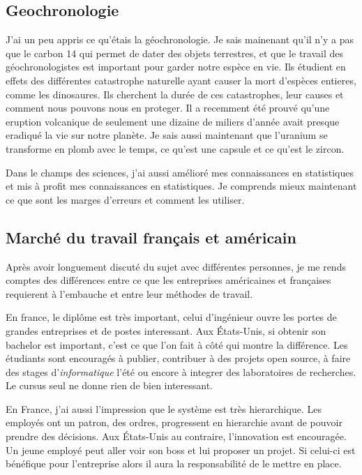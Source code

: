 \subsection{Geochronologie}
J'ai un peu appris ce qu'étais la géochronologie. Je sais mainenant qu'il n'y a pas que le carbon 14 qui permet de dater des objets terrestres, et que le travail des géochronologistes est important pour garder notre espèce en vie. Ils étudient en effets des différentes catastrophe naturelle ayant causer la mort d'espèces entieres, comme les dinosaures. Ils cherchent la durée de ces catastrophes, leur causes et comment nous pouvons nous en proteger. Il a recemment été prouvé qu'une eruption volcanique de seulement une dizaine de miliers d'année avait presque eradiqué la vie sur notre planète.
Je sais aussi maintenant que l'uranium se transforme en plomb avec le temps, ce qu'est une capsule et ce qu'est le zircon.

Dans le champs des sciences, j'ai aussi amélioré mes connaissances en statistiques et mis à profit mes connaissances en statistiques. Je comprends mieux maintenant ce que sont les marges d'erreurs et comment les utiliser.

\subsection{Marché du travail français et américain}
Après avoir longuement discuté du sujet avec différentes personnes, je me rends comptes des différences entre ce que les entreprises américaines et françaises requierent à l'embauche et entre leur méthodes de travail. 

En france, le diplôme est très important, celui d'ingénieur ouvre les portes de grandes entreprises et de postes interessant. Aux États-Unis, si obtenir son bachelor est important, c'est ce que l'on fait à côté qui montre la différence. Les étudiants sont encouragés à publier, contribuer à des projets open source, à faire des stages d'\emph{informatique} l'été ou encore à integrer des laboratoires de recherches. Le cursus seul ne donne rien de bien interessant.

En France, j'ai aussi l'impression que le système est très hierarchique. Les employés ont un patron, des ordres, progressent en hierarchie avant de pouvoir prendre des décisions. Aux États-Unis au contraire, l'innovation est encouragée. Un jeune employé peut aller voir son boss et lui proposer un projet. Si celui-ci est bénéfique pour l'entreprise alors il aura la responsabilité de le mettre en place. 

